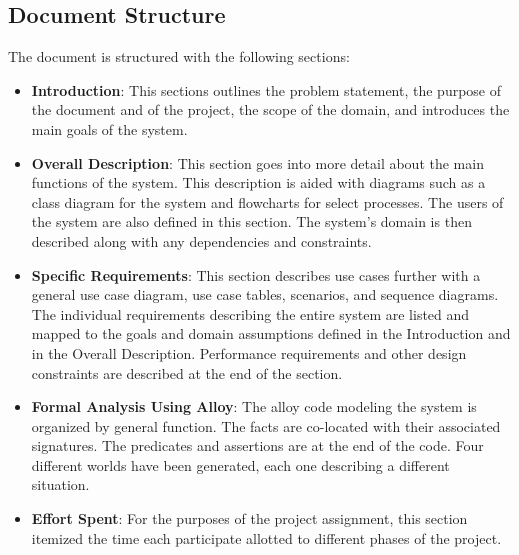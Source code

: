 \subsection{Document Structure}
The document is structured with the following sections:
\begin{itemize}
\item \textbf{Introduction}: This sections outlines the problem statement, the purpose of the document and of the project, the scope of the domain, and introduces the main goals of the system. 
\item \textbf{Overall Description}: This section goes into more detail about the main functions of the system. This description is aided with diagrams such as a class diagram for the system and flowcharts for select processes. The users of the system are also defined in this section. The system's domain is then described along with any dependencies and constraints. 
\item \textbf{Specific Requirements}: This section describes use cases further with a general use case diagram, use case tables, scenarios, and sequence diagrams. The individual requirements describing the entire system are listed and mapped to the goals and domain assumptions defined in the Introduction and in the Overall Description. Performance requirements and other design constraints are described at the end of the section.
\item \textbf{Formal Analysis Using Alloy}: The alloy code modeling the system is organized by general function. The facts are co-located with their associated signatures. The predicates and assertions are at the end of the code. Four different worlds have been generated, each one describing a different situation.
\item \textbf{Effort Spent}: For the purposes of the project assignment, this section itemized the time each participate allotted to different phases of the project. 
\end{itemize}


